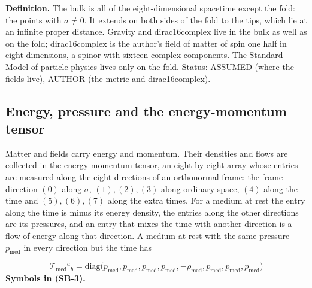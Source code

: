 \documentclass[
  10pt,
]{article}
\begin{document}
\textbf{Definition.} The bulk is all of the eight-dimensional spacetime
except the fold: the points with \(\sigma \neq 0\). It extends on both
sides of the fold to the tips, which lie at an infinite proper distance.
Gravity and dirac16complex live in the bulk as well as on the fold;
dirac16complex is the author's field of matter of spin one half in eight
dimensions, a spinor with sixteen complex components. The Standard Model
of particle physics lives only on the fold. Status: ASSUMED (where the
fields live), AUTHOR (the metric and dirac16complex).

\hypertarget{energy-pressure-and-the-energy-momentum-tensor}{%
\subsection{Energy, pressure and the energy-momentum
tensor}\label{energy-pressure-and-the-energy-momentum-tensor}}

Matter and fields carry energy and momentum. Their densities and flows
are collected in the energy-momentum tensor, an eight-by-eight array
whose entries are measured along the eight directions of an orthonormal
frame: the frame direction \((0)\) along \(\sigma\), \((1), (2), (3)\)
along ordinary space, \((4)\) along the time and \((5), (6), (7)\) along
the extra times. For a medium at rest the entry along the time is minus
its energy density, the entries along the other directions are its
pressures, and an entry that mixes the time with another direction is a
flow of energy along that direction. A medium at rest with the same
pressure \(p_{\mathrm{med}}\) in every direction but the time has

\[
\mathcal{T}_{\mathrm{med}}{}^a{}_b = \mathrm{diag}\big(p_{\mathrm{med}}, p_{\mathrm{med}}, p_{\mathrm{med}}, p_{\mathrm{med}},
 -\rho_{\mathrm{med}}, p_{\mathrm{med}}, p_{\mathrm{med}}, p_{\mathrm{med}}\big) \tag{SB-3}
\] \textbf{Symbols in (SB-3).}
\end{document}
